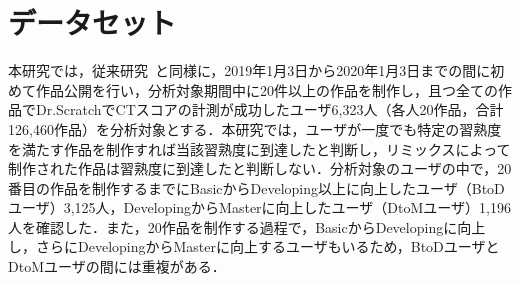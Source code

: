 \documentclass[submit]{ipsj}
\begin{document}



\section{データセット}\label{sec:chapter_3-1}
本研究では，従来研究~\cite{Ando_2021}と同様に，2019年1月3日から2020年1月3日までの間に初めて作品公開を行い，分析対象期間中に20件以上の作品を制作し，且つ全ての作品でDr.ScratchでCTスコアの計測が成功したユーザ6,323人（各人20作品，合計126,460作品）を分析対象とする．本研究では，ユーザが一度でも特定の習熟度を満たす作品を制作すれば当該習熟度に到達したと判断し，リミックスによって制作された作品は習熟度に到達したと判断しない．分析対象のユーザの中で，20番目の作品を制作するまでにBasicからDeveloping以上に向上したユーザ（BtoDユーザ）3,125人，DevelopingからMasterに向上したユーザ（DtoMユーザ）1,196人を確認した．また，20作品を制作する過程で，BasicからDevelopingに向上し，さらにDevelopingからMasterに向上するユーザもいるため，BtoDユーザとDtoMユーザの間には重複がある．
\end{document}
